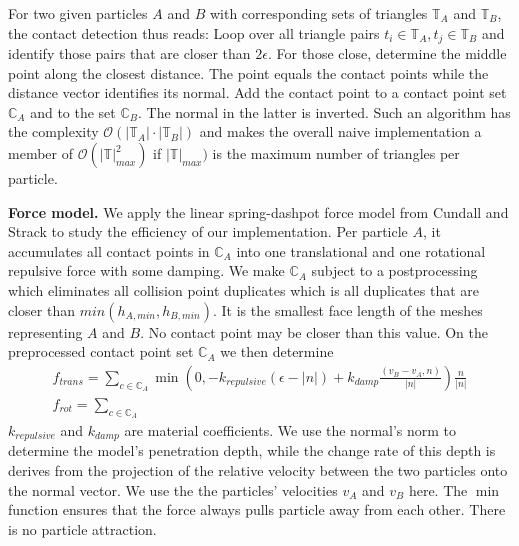 For two given particles $A$ and $B$ with corresponding sets of triangles
$\mathbb{T}_A$ and $\mathbb{T}_B$, the contact detection thus reads:
Loop over all triangle pairs $t_i \in \mathbb{T}_A, t_j \in \mathbb{T}_B$ and
identify those pairs that are closer than $2\epsilon $.
For those close, determine the middle point along the closest distance. 
The point equals the contact points while the distance vector identifies
its normal.
Add the contact point to a contact point set $\mathbb{C}_A$ and to the set
$\mathbb{C}_B$.
The normal in the latter is inverted.
Such an algorithm has the complexity $\mathcal{O}( | \mathbb{T}_A| \cdot
|\mathbb{T}_B|)$ and makes the overall naive implementation a member of 
$\mathcal{O}( | \mathbb{T} |_{max}^2  )$ if $| \mathbb{T} |_{max} )$
is the maximum number of triangles per particle.


{\bf Force model.}
We apply the linear spring-dashpot force model from Cundall and
Strack \cite{19,Samiei} to study the efficiency of our implementation.
Per particle $A$, it accumulates all contact points in $\mathbb{C}_A$ into one
translational and one rotational repulsive force with some damping.
We make $\mathbb{C}_A$ subject to a postprocessing which eliminates all
collision point duplicates which is all duplicates that are closer than
$min(h_{A,min},h_{B,min})$. 
It is the smallest face length of the meshes representing $A$ and $B$.
No contact point may be closer than this value.
On the preprocessed contact point set $\mathbb{C}_A$ we then determine
\begin{eqnarray}
  f_{trans} = \sum _{c \in \mathbb{C}_A} 
  \min \left( 0, -k_{repulsive} (\epsilon - |n|) + k_{damp}
  \frac{(v_B-v_A,n)}{|n|}  \right) \frac{n}{|n|}
  \label{equation:forces:translational}
  \\
  f_{rot} = \sum _{c \in \mathbb{C}_A}
  \label{equation:forces:rotational}
\end{eqnarray}
\noindent
$k_{repulsive}$ and $k_{damp}$ are material coefficients. 
We use the normal's norm to determine the model's penetration depth, while the
change rate of this depth is derives from the projection of the relative
velocity between the two particles onto the normal vector.
We use the the particles' velocities $v_A$ and $v_B$ here.
The $\min $ function ensures that the force always pulls particle away from each
other. 
There is no particle attraction.


